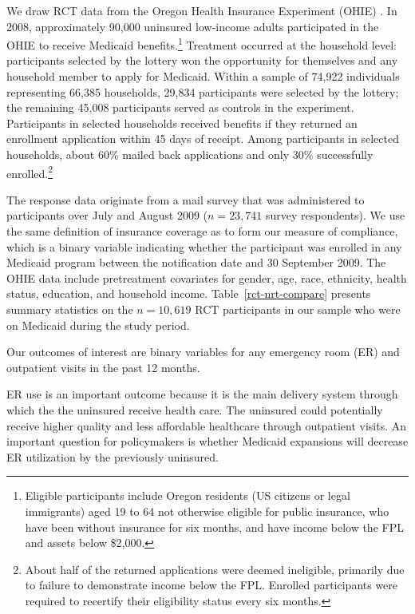 \documentclass[hidelinks,12pt]{article}
\begin{document}
{We draw RCT data from the Oregon Health Insurance Experiment (OHIE) \citep{finkelstein2012,baicker2013,baicker2014,Taubman}. In 2008, approximately 90,000 uninsured low-income adults participated in the OHIE to receive Medicaid benefits.\footnote{Eligible participants include Oregon residents (US citizens or legal immigrants) aged 19 to 64 not otherwise eligible for public insurance, who have been without insurance for six months, and have income below the FPL and assets below \$2,000.} Treatment occurred at the household level: participants selected by the lottery won the opportunity for themselves and any household member to apply for Medicaid. Within a sample of 74,922 individuals representing 66,385 households, 29,834 participants were selected by the lottery; the remaining 45,008 participants served as controls in the experiment. Participants in selected households received benefits if they returned an enrollment application within 45 days of receipt. Among participants in selected households, about 60\% mailed back applications and only 30\% successfully enrolled.\footnote{{\color{red}About half of the returned applications were deemed ineligible, primarily due to failure to demonstrate income below the FPL. Enrolled participants were required to recertify their eligibility status every six months.}}

The response data originate from a mail survey that was administered to participants over July and August 2009 ($n = 23,741$ survey respondents). We use the same definition of insurance coverage as \citet{finkelstein2012} to form our measure of compliance, which is a binary variable indicating whether the participant was enrolled in any Medicaid program between the notification date and 30 September 2009. The OHIE data include pretreatment covariates for gender, age, race, ethnicity, health status, education, and household income.  {\color{red}Table~\ref{rct-nrt-compare} presents summary statistics on the $n=10,619$ RCT participants in our sample who were on Medicaid during the study period.}

Our outcomes of interest are binary variables for any emergency room (ER) and outpatient visits in the past 12 months. {\color{red}ER use is an important outcome because it is the main delivery system through which the the uninsured receive health care. The uninsured could potentially receive higher quality and less affordable healthcare through outpatient visits. An important question for policymakers is whether Medicaid expansions will decrease ER utilization by the previously uninsured.   	

}}
\end{document}
